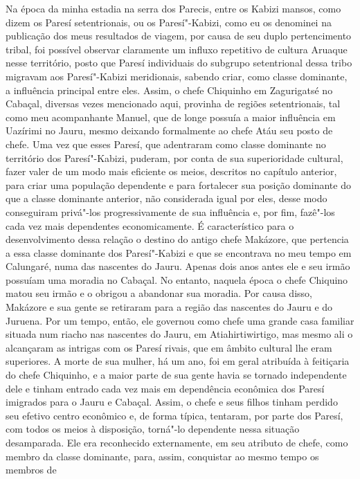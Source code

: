 Na época da minha estadia na serra dos Parecis, entre os Kabizi mansos,
como dizem os Paresí setentrionais, ou os Paresí"-Kabizi, como eu os
denominei na publicação dos meus resultados de viagem, por causa de seu
duplo pertencimento tribal, foi possível observar claramente um influxo
repetitivo de cultura Aruaque nesse território, posto que Paresí
individuais do subgrupo setentrional dessa tribo migravam aos
Paresí"-Kabizi meridionais, sabendo criar, como classe dominante, a
influência principal entre eles. Assim, o chefe Chiquinho em Zagurigatsé
no Cabaçal, diversas vezes mencionado aqui, provinha de regiões
setentrionais, tal como meu acompanhante Manuel, que de longe possuía a
maior influência em Uazírimi no Jauru, mesmo deixando formalmente ao
chefe Atáu seu posto de chefe. Uma vez que esses Paresí, que adentraram
como classe dominante no território dos Paresí"-Kabizi, puderam, por
conta de sua superioridade cultural, fazer valer de um modo mais
eficiente os meios, descritos no capítulo anterior, para criar uma
população dependente e para fortalecer sua posição dominante do que a
classe dominante anterior, não considerada igual por eles, desse modo
conseguiram privá"-los progressivamente de sua influência e, por fim,
fazê"-los cada vez mais dependentes economicamente. É característico para
o desenvolvimento dessa relação o destino do antigo chefe Makázore, que
pertencia a essa classe dominante dos Paresí"-Kabizi e que se encontrava
no meu tempo em Calungaré, numa das nascentes do Jauru. Apenas dois
anos antes ele e seu irmão possuíam uma moradia no Cabaçal. No entanto,
naquela época o chefe Chiquino matou seu irmão e o obrigou a abandonar
sua moradia. Por causa disso, Makázore e sua gente se retiraram para a
região das nascentes do Jauru e do Juruena. Por um tempo, então, ele
governou como chefe uma grande casa familiar situada num riacho nas
nascentes do Jauru, em Atiahirtiwirtigo, mas mesmo ali o alcançaram as
intrigas com os Paresí rivais, que em âmbito cultural lhe eram
superiores. A morte de sua mulher, há um ano, foi em geral atribuída à
feitiçaria do chefe Chiquinho, e a maior parte de sua gente havia se
tornado independente dele e tinham entrado cada vez mais em dependência
econômica dos Paresí imigrados para o Jauru e Cabaçal. Assim, o chefe e
seus filhos tinham perdido seu efetivo centro econômico e, de forma
típica, tentaram, por parte dos Paresí, com todos os meios à
disposição, torná"-lo dependente nessa situação desamparada. Ele era
reconhecido externamente, em seu atributo de chefe, como membro da
classe dominante, para, assim, conquistar ao mesmo tempo os membros de
